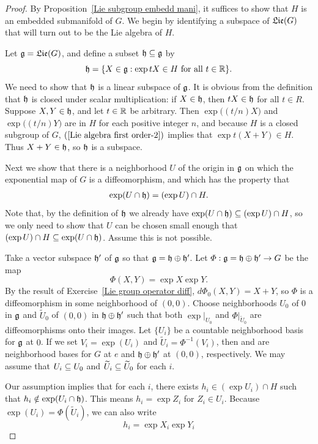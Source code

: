 \begin{proof}
By Proposition~\ref{Lie subgroup embedd mani}, it suffices to show that $H$ is an embedded submanifold of $G$. We begin by identifying a subspace of $\mathfrak{Lie}(G)$ that will turn out to be the Lie algebra of $H$.\par
Let $\mathfrak{g}=\mathfrak{Lie}(G)$, and define a subset $\mathfrak{h}\subseteq\mathfrak{g}$ by
\[\mathfrak{h}=\{X\in\mathfrak{g}:\exp tX\in H\text{ for all }t\in\mathbb{R}\}.\]
We need to show that $\mathfrak{h}$ is a linear subspace of $\mathfrak{g}$. It is obvious from the definition that $\mathfrak{h}$ is closed under scalar multiplication: if $X\in\mathfrak{h}$, then $tX\in\mathfrak{h}$ for all $t\in R$. Suppose $X,Y\in\mathfrak{h}$, and let $t\in\mathbb{R}$ be arbitrary. Then $\exp\big((t/n)X\big)$ and $\exp\big((t/n)Y\big)$ are in $H$ for each positive integer $n$, and because $H$ is a closed subgroup of $G$, $(\ref{Lie algebra first order-2})$ implies that $\exp t(X+Y)\in H$. Thus $X+Y\in\mathfrak{h}$, so $\mathfrak{h}$ is a subspace.\par
Next we show that there is a neighborhood $U$ of the origin in $\mathfrak{g}$ on which the
exponential map of $G$ is a diffeomorphism, and which has the property that
\begin{align}\label{Lie closed subgroup-1}
\exp(U\cap\mathfrak{h})=(\exp U)\cap H.
\end{align}
Note that, by the definition of $\mathfrak{h}$ we already have $\exp(U\cap\mathfrak{h})\subseteq(\exp U)\cap H$, so we only need to show that $U$ can be chosen small enough that $(\exp U)\cap H\subseteq\exp(U\cap\mathfrak{h})$. Assume this is not possible.\par
Take a vector subspace $\mathfrak{h}'$ of $\mathfrak{g}$ so that $\mathfrak{g}=\mathfrak{h}\oplus\mathfrak{h}'$. Let $\varPhi:\mathfrak{g}=\mathfrak{h}\oplus\mathfrak{h}'\to G$ be the map
\[\varPhi(X,Y)=\exp X\exp Y.\]
By the result of Exercise~\ref{Lie group operator diff}, $d\varPhi_0(X,Y)=X+Y$, so $\varPhi$ is a diffeomorphism in some neighborhood of $(0,0)$. Choose neighborhoods $U_0$ of $0$ in $\mathfrak{g}$ and $\widetilde{U}_0$ of $(0,0)$ in $\mathfrak{h}\oplus\mathfrak{h}'$ such that both $\exp|_{U_0}$ and $\varPhi|_{\widetilde{U}_0}$ are diffeomorphisms onto their images. Let $\{U_i\}$ be a countable neighborhood basis for $\mathfrak{g}$ at $0$. If we set $V_i=\exp(U_i)$ and $\widetilde{U}_i=\varPhi^{-1}(V_i)$, then and are neighborhood bases for $G$ at $e$ and $\mathfrak{h}\oplus\mathfrak{h}'$ at $(0,0)$, respectively. We may assume that $U_i\subseteq U_0$ and $\widetilde{U}_i\subseteq\widetilde{U}_0$ for each $i$.\par
Our assumption implies that for each $i$, there exists $h_i\in(\exp U_i)\cap H$ such that $h_i\notin\exp(U_i\cap\mathfrak{h})$. This means $h_i=\exp Z_i$ for $Z_i\in U_i$. Because $\exp(U_i)=\varPhi(\widetilde{U}_i)$, we can also write
\[h_i=\exp X_i\exp Y_i\]

\end{proof}

